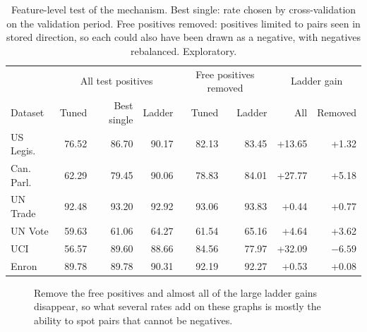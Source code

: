\documentclass[11pt,a4paper]{article}
\theoremstyle{plain}
\theoremstyle{definition}
\begin{document}
\begin{table}[H]\centering\small\setlength{\tabcolsep}{5pt}
\begin{tabular}{lrrrrrrr}
\toprule
 & \multicolumn{3}{c}{All test positives} & \multicolumn{2}{c}{Free positives removed} & \multicolumn{2}{c}{Ladder gain}\\
Dataset & Tuned & Best single & Ladder & Tuned & Ladder & All & Removed\\
\midrule
US Legis. & 76.52 & 86.70 & 90.17 & 82.13 & 83.45 & +13.65 & +1.32\\
Can. Parl. & 62.29 & 79.45 & 90.06 & 78.83 & 84.01 & +27.77 & +5.18\\
UN Trade & 92.48 & 93.20 & 92.92 & 93.06 & 93.83 & +0.44 & +0.77\\
UN Vote & 59.63 & 61.06 & 64.27 & 61.54 & 65.16 & +4.64 & +3.62\\
UCI & 56.57 & 89.60 & 88.66 & 84.56 & 77.97 & +32.09 & $-6.59$\\
Enron & 89.78 & 89.78 & 90.31 & 92.19 & 92.27 & +0.53 & +0.08\\
\bottomrule
\end{tabular}
\caption{Feature-level test of the mechanism. Best single: rate chosen by cross-validation on the validation period. Free positives removed: positives limited to pairs seen in stored direction, so each could also have been drawn as a negative, with negatives rebalanced. Exploratory.}\label{tab:feature}
\end{table}

\begin{figure}[H]\centering
{}
\caption{Remove the free positives and almost all of the large ladder gains disappear, so what several rates add on these graphs is mostly the ability to spot pairs that cannot be negatives.}\label{fig:seen}
\end{figure}
\end{document}
